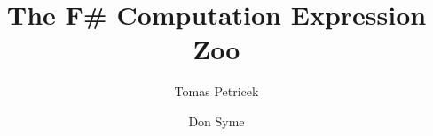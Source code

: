 \documentclass[runningheads,a4paper]{llncs}
\begin{document}
\title{The F\# Computation Expression Zoo}
\author{Tomas Petricek \and Don Syme}


\maketitle


\newcommand{\sep}[0]{\; | \;}
\newcommand{\kvd}[1]{\textnormal{\bfseries\sffamily #1}}
\newcommand{\plc}[1]{\textnormal{\emph{#1}}}
\newcommand{\ident}[1]{\textnormal{\sffamily #1}}

\newcommand{\cexpr}{\plc{cexpr}}
\newcommand{\expr}{\plc{expr}}
\newcommand{\binds}{\plc{binds}}
\newcommand{\pat}{\plc{pat}}

\newcommand{\mtyp}[1]{M #1}
\newcommand{\ntyp}[1]{N #1}
\newcommand{\ltyp}[1]{L #1}
\newcommand{\dtyp}[1]{D #1}

\newcommand{\tya}[2]{#1\hspace{-0.15em}:\hspace{-0.15em}#2}
\newcommand{\cvdash}{\Vdash_\sigma}
\newcommand{\bvdash}{\vartriangleright_\sigma}
\newcommand{\unit}{\ident{unit}}

\newcommand{\tsl}[1]{|[ \,#1\, |]_m}
\newcommand{\tsb}[1]{\langle\hspace{-0.25em}\langle #1 \rangle\hspace{-0.25em}\rangle_m}
\newcommand{\tsv}[1]{\langle #1 \rangle}

\end{document}
